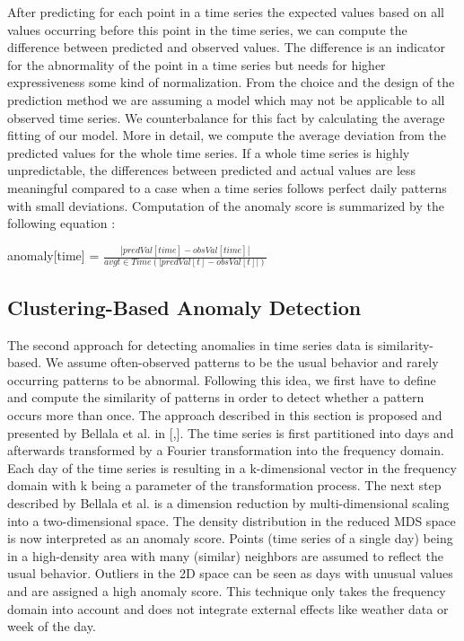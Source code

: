 After predicting for each point in a time series the expected values based on all values occurring before this point in the time series, we can compute the difference between predicted and observed values. The difference is an indicator for the abnormality of the point in a time series but needs for higher expressiveness some kind of normalization. From the choice and the design of the prediction method we are assuming a model which may not be applicable to all observed time series. We counterbalance for this fact by calculating the average fitting of our model. More in detail, we compute the average deviation from the predicted values for the whole time series. If a whole time series is highly unpredictable, the differences between predicted and actual values are less meaningful compared to a case when a time series follows perfect daily patterns with small deviations. Computation of the anomaly score is summarized by the following equation \cite{janetzko2014anomaly}:

anomaly[time] = $\frac{|predVal[time] - obsVal[time]|}{avgt∈Time (|predVal[t] - obsVal[t]|)}$\\

\subsection*{Clustering-Based Anomaly Detection}
\frenchspacing
The second approach for detecting anomalies in time series data is similarity-based. We assume often-observed patterns to be the usual behavior and rarely occurring patterns to be abnormal. Following this idea, we first have to define and compute the similarity of patterns in order to detect whether a pattern occurs more than once. The approach described in this section is proposed and presented by Bellala et al. in [\cite{bellala2012following},\cite{bellala2011towards}]. The time series is first partitioned into days and afterwards transformed by a Fourier transformation into the frequency domain. Each day of the time series is resulting in a k-dimensional vector in the frequency domain with k being a parameter of the transformation process. The next step described by Bellala et al. is a dimension reduction by multi-dimensional scaling into a two-dimensional space. The density distribution in the reduced MDS space is now interpreted as an anomaly score. Points (time series of a single day) being in a high-density area with many (similar) neighbors are assumed to reflect the usual behavior. Outliers in the 2D space can be seen as days with unusual values and are assigned a high anomaly score. This technique only takes the frequency domain into account and does not integrate external effects like weather data or week of the day.\\


